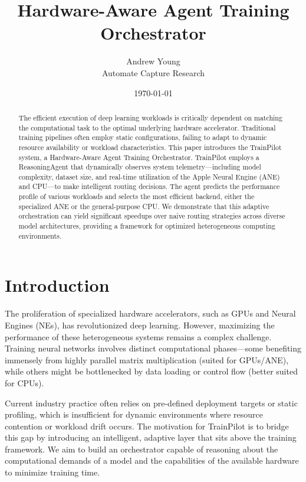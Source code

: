 \documentclass[11pt,a4paper]{article}
\title{Hardware-Aware Agent Training Orchestrator}
\author{Andrew Young \\ Automate Capture Research}
\date{\today}
\begin{document}
\maketitle

\begin{abstract}
The efficient execution of deep learning workloads is critically dependent on matching the computational task to the optimal underlying hardware accelerator. Traditional training pipelines often employ static configurations, failing to adapt to dynamic resource availability or workload characteristics. This paper introduces the TrainPilot system, a Hardware-Aware Agent Training Orchestrator. TrainPilot employs a ReasoningAgent that dynamically observes system telemetry—including model complexity, dataset size, and real-time utilization of the Apple Neural Engine (ANE) and CPU—to make intelligent routing decisions. The agent predicts the performance profile of various workloads and selects the most efficient backend, either the specialized ANE or the general-purpose CPU. We demonstrate that this adaptive orchestration can yield significant speedups over naive routing strategies across diverse model architectures, providing a framework for optimized heterogeneous computing environments.
\end{abstract}

\section{Introduction}
The proliferation of specialized hardware accelerators, such as GPUs and Neural Engines (NEs), has revolutionized deep learning. However, maximizing the performance of these heterogeneous systems remains a complex challenge. Training neural networks involves distinct computational phases—some benefiting immensely from highly parallel matrix multiplication (suited for GPUs/ANE), while others might be bottlenecked by data loading or control flow (better suited for CPUs).

Current industry practice often relies on pre-defined deployment targets or static profiling, which is insufficient for dynamic environments where resource contention or workload drift occurs. The motivation for TrainPilot is to bridge this gap by introducing an intelligent, adaptive layer that sits above the training framework. We aim to build an orchestrator capable of reasoning about the computational demands of a model and the capabilities of the available hardware to minimize training time.
\end{document}
